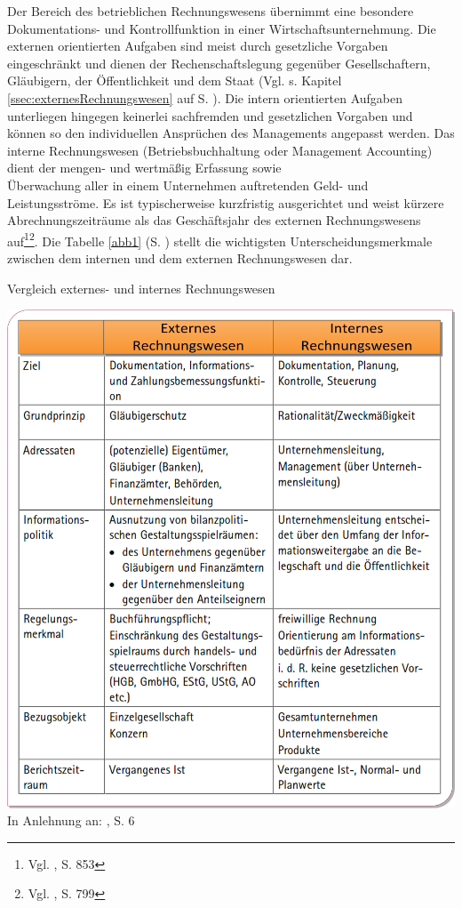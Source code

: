 Der Bereich des betrieblichen Rechnungswesens übernimmt eine besondere Dokumentations- und Kontrollfunktion in einer Wirtschaftsunternehmung.
Die externen orientierten Aufgaben sind meist durch gesetzliche Vorgaben eingeschränkt und dienen der Rechenschaftslegung gegenüber Gesellschaftern, Gläubigern, der Öffentlichkeit und dem Staat (Vgl. s. Kapitel \ref{ssec:externesRechnungswesen} auf S. \pageref{ssec:externesRechnungswesen}).
Die intern orientierten Aufgaben unterliegen hingegen keinerlei sachfremden und gesetzlichen Vorgaben und können so den individuellen Ansprüchen des Managements angepasst werden. Das interne Rechnungswesen (Betriebsbuchhaltung oder Management Accounting) dient der mengen- und wertmäßig Erfassung sowie\\ Überwachung aller in einem Unternehmen auftretenden Geld- und Leistungsströme. Es ist typischerweise kurzfristig ausgerichtet und weist kürzere Abrechnungszeiträume als das Geschäftsjahr des externen Rechnungswesens auf\footnote{Vgl. \cite{Wohe2000}, S. 853}\footnote{Vgl. \cite{Schierenbeck2008}, S. 799}.
Die Tabelle \ref{abb1} (S. \pageref{abb1}) stellt die wichtigsten Unterscheidungsmerkmale zwischen dem internen und dem externen Rechnungswesen dar.\\
\begin{table}[htbp]
\begin{center}
\caption[Vergleich externes- und internes Rechnungswesen]{Vergleich externes- und internes Rechnungswesen}
\includegraphics[width=1\textwidth]{Images/VergleichIntExt.png}
\label{abb1}
{\footnotesize In Anlehnung an: \cite{Lojewski2001}, S. 6}
\end{center}
\end{table} 

